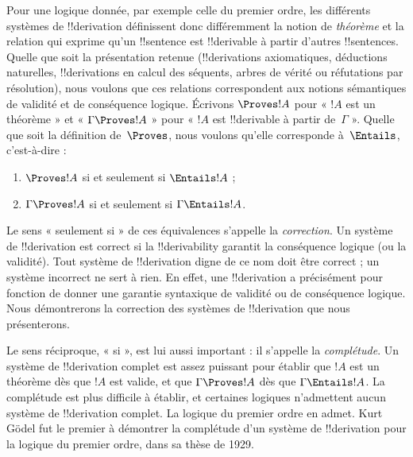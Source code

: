 \documentclass[11pt,a4paper,openany]{memoir}
\begin{document}
Pour une logique donnée, par exemple celle du premier ordre, les
différents systèmes de !!{derivation} définissent donc différemment la
notion de \emph{théorème} et la relation qui exprime qu'un !!{sentence}
est !!{derivable} à partir d'autres !!{sentence}s.
Quelle que soit la présentation retenue (!!{derivation}s axiomatiques,
déductions naturelles, !!{derivation}s en calcul des séquents, arbres de
vérité ou réfutations par résolution), nous voulons que ces relations
correspondent aux notions sémantiques de validité et de conséquence
logique. Écrivons $\Proves !A$ pour « $!A$ est un théorème » et
« $\Gamma \Proves !A$ » pour « $!A$ est !!{derivable} à partir
de~$\Gamma$ ». Quelle que soit la définition de~$\Proves$, nous voulons
qu'elle corresponde à~$\Entails$, c'est-à-dire :
\begin{enumerate}
\item $\Proves !A$ si et seulement si $\Entails !A$ ;
\item $\Gamma \Proves !A$ si et seulement si $\Gamma \Entails !A$.
\end{enumerate}
Le sens « seulement si » de ces équivalences s'appelle la
\emph{correction}. Un système de !!{derivation} est correct si la
!!{derivability} garantit la conséquence logique (ou la validité).
Tout système de !!{derivation} digne de ce nom doit être correct ; un
système incorrect ne sert à rien. En effet, une !!{derivation} a
précisément pour fonction de donner une garantie syntaxique de validité
ou de conséquence logique. Nous démontrerons la correction des systèmes
de !!{derivation} que nous présenterons.

Le sens réciproque, « si », est lui aussi important : il s'appelle la
\emph{complétude}. Un système de !!{derivation} complet est assez
puissant pour établir que $!A$ est un théorème dès que $!A$ est valide,
et que $\Gamma \Proves !A$ dès que $\Gamma \Entails !A$.
La complétude est plus difficile à établir, et certaines logiques
n'admettent aucun système de !!{derivation} complet. La logique du
premier ordre en admet. Kurt G\"odel fut le premier à démontrer la
complétude d'un système de !!{derivation} pour la logique du premier
ordre, dans sa thèse de 1929.
\end{document}
